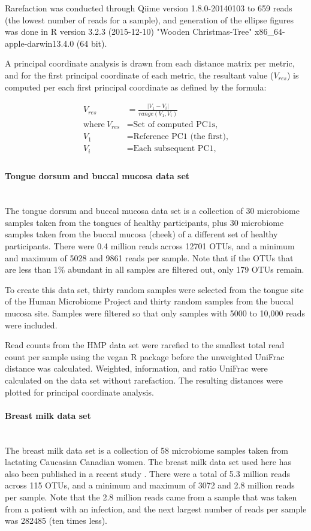 \documentclass[10pt,letterpaper]{article}
\begin{document}
Rarefaction was conducted through Qiime version 1.8.0-20140103 to 659 reads (the lowest number of reads for a sample), and generation of the ellipse figures was done in R version 3.2.3 (2015-12-10) "Wooden Christmas-Tree" x86\_64-apple-darwin13.4.0 (64 bit).

A principal coordinate analysis is drawn from each distance matrix per metric, and for the first principal coordinate of each metric, the resultant value ($V_{res}$) is computed per each first principal coordinate as defined by the formula:

\begin{align*}
  V_{res} &=\frac{|V_1 - V_i|}{range(V_1, V_i)} \\
  \text{where}~V_{res}&= \text{Set of computed PC1s,} \\
  V_1 &= \text{Reference PC1 (the first),} \\
  V_i &= \text{Each subsequent PC1,} \\
\end{align*}

\paragraph{Tongue dorsum and buccal mucosa data set}\mbox{}\\
The tongue dorsum and buccal mucosa data set is a collection of 30 microbiome samples taken from the tongues of healthy participants, plus 30 microbiome samples taken from the buccal mucosa (cheek) of a different set of healthy participants. There were 0.4 million reads across 12701 OTUs, and a minimum and maximum of 5028 and 9861 reads per sample. Note that if the OTUs that are less than 1\% abundant in all samples are filtered out, only 179 OTUs remain.

To create this data set, thirty random samples were selected from the tongue site of the Human Microbiome Project \cite{turnbaugh2007human} and thirty random samples from the buccal mucosa site. Samples were filtered so that only samples with 5000 to 10,000 reads were included.

Read counts from the HMP data set were rarefied to the smallest total read count per sample using the vegan R package \cite{oksanen2007vegan} before the unweighted UniFrac distance was calculated. Weighted, information, and ratio UniFrac were calculated on the data set without rarefaction. The resulting distances were plotted for principal coordinate analysis.

\paragraph{Breast milk data set}\mbox{}\\
The breast milk data set is a collection of 58 microbiome samples taken from lactating Caucasian Canadian women. The breast milk data set used here has also been published in a recent study \cite{urbaniak2016human}. There were a total of 5.3 million reads across 115 OTUs, and a minimum and maximum of 3072 and 2.8 million reads per sample. Note that the 2.8 million reads came from a sample that was taken from a patient with an infection, and the next largest number of reads per sample was 282485 (ten times less).
\end{document}
